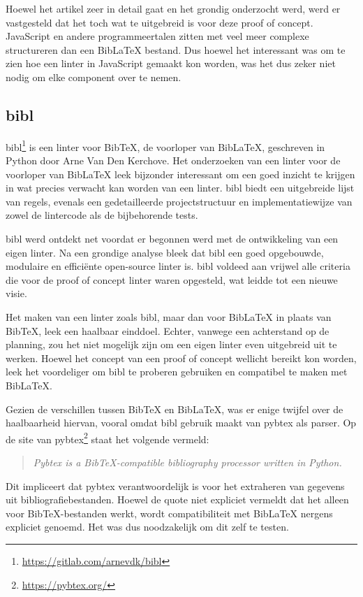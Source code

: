 Hoewel het artikel zeer in detail gaat en het grondig onderzocht werd, werd er vastgesteld dat het toch wat te uitgebreid is voor deze proof of concept. JavaScript en andere programmeertalen zitten met veel meer complexe structureren dan een BibLaTeX bestand. Dus hoewel het interessant was om te zien hoe een linter in JavaScript gemaakt kon worden, was het dus zeker niet nodig om elke component over te nemen.


\subsection{bibl}
bibl\footnote{\url{https://gitlab.com/arnevdk/bibl}} is een linter voor BibTeX, de voorloper van BibLaTeX, geschreven in Python door Arne Van Den Kerchove. Het onderzoeken van een linter voor de voorloper van BibLaTeX leek bijzonder interessant om een goed inzicht te krijgen in wat precies verwacht kan worden van een linter. bibl biedt een uitgebreide lijst van regels, evenals een gedetailleerde projectstructuur en implementatiewijze van zowel de lintercode als de bijbehorende tests.

bibl werd ontdekt net voordat er begonnen werd met de ontwikkeling van een eigen linter. Na een grondige analyse bleek dat bibl een goed opgebouwde, modulaire en efficiënte open-source linter is. bibl voldeed aan vrijwel alle criteria die voor de proof of concept linter waren opgesteld, wat leidde tot een nieuwe visie.

Het maken van een linter zoals bibl, maar dan voor BibLaTeX in plaats van BibTeX, leek een haalbaar einddoel. Echter, vanwege een achterstand op de planning, zou het niet mogelijk zijn om een eigen linter even uitgebreid uit te werken. Hoewel het concept van een proof of concept wellicht bereikt kon worden, leek het voordeliger om bibl te proberen gebruiken en compatibel te maken met BibLaTeX.

Gezien de verschillen tussen BibTeX en BibLaTeX, was er enige twijfel over de haalbaarheid hiervan, vooral omdat bibl gebruik maakt van pybtex als parser. Op de site van pybtex\footnote{\url{https://pybtex.org/}} staat het volgende vermeld:

\begin{quote}\emph{Pybtex is a BibTeX-compatible bibliography processor written in Python.}\end{quote}

Dit impliceert dat pybtex verantwoordelijk is voor het extraheren van gegevens uit bibliografiebestanden. Hoewel de quote niet expliciet vermeldt dat het alleen voor BibTeX-bestanden werkt, wordt compatibiliteit met BibLaTeX nergens expliciet genoemd. Het was dus noodzakelijk om dit zelf te testen.

